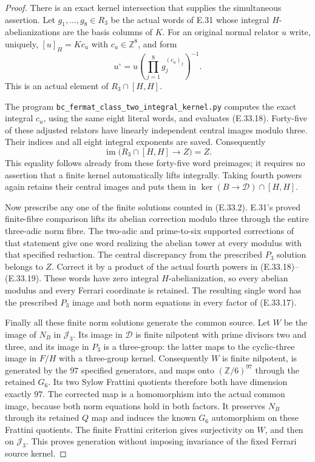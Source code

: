 \begin{proof}
There is an exact kernel intersection that supplies the
simultaneous assertion.  Let $g_1,\ldots,g_8\in R_3$
be the actual words of E.31 whose integral
$H$-abelianizations are the basis columns of $K$.
For an original normal relator $u$ write, uniquely,
$[u]_H=Kc_u$ with $c_u\in\mathbb Z^8$, and form
\[
 u^\circ=u\left(\prod_{j=1}^8g_j^{(c_u)_j}\right)^{-1}.
 \tag{E.33.18}
\]
This is an actual element of $R_3\cap[H,H]$.

The program
\texttt{bc\_fermat\_class\_two\_integral\_kernel.py}
computes the exact integral $c_u$, using the same
eight literal words, and evaluates \textup{(E.33.18)}.
Forty-five of these adjusted relators have linearly
independent central images modulo three.  Their
indices and all eight integral exponents are saved.
Consequently
\[
 \operatorname{im}\bigl(R_3\cap[H,H]\longrightarrow Z\bigr)
                              =Z.
 \tag{E.33.19}
\]
This equality follows already from these forty-five
word preimages; it requires no assertion that a
finite kernel automatically lifts integrally.
Taking fourth powers again retains their central
images and puts them in
$\ker(B\to\mathscr D)\cap[H,H]$.

Now prescribe any one of the finite solutions counted
in \textup{(E.33.2)}.  E.31's proved finite-fibre
comparison lifts its abelian correction modulo three
through the entire three-adic norm fibre.  The two-adic
and prime-to-six supported corrections of that statement
give one word realizing the abelian tower at every
modulus with that specified reduction.
The central discrepancy from the prescribed $P_3$
solution belongs to $Z$.  Correct it by a product
of the actual fourth powers in
\textup{(E.33.18)--(E.33.19)}.
These words have zero integral $H$-abelianization,
so every abelian modulus and every Ferrari coordinate
is retained.  The resulting single word has the
prescribed $P_3$ image and both norm equations in
every factor of \textup{(E.33.17)}.

Finally all these finite norm solutions generate
the common source.  Let $W$ be the image of $N_B$
in $\mathscr J_3$.  Its image in $\mathscr D$
is finite nilpotent with prime divisors two and
three, and its image in $P_3$ is a three-group:
the latter maps to the cyclic-three image in
$F/H$ with a three-group kernel.
Consequently $W$ is finite nilpotent, is generated
by the $97$ specified generators, and maps onto
$(\mathbb Z/6)^{97}$ through the retained $G_6$.
Its two Sylow Frattini quotients therefore both
have dimension exactly $97$.
The corrected map is a homomorphism into the
actual common image, because both norm equations
hold in both factors.  It preserves $N_B$ through
its retained $Q$ map and induces the known
$G_6$ automorphism on these Frattini quotients.
The finite Frattini criterion gives surjectivity
on $W$, and then on $\mathscr J_3$.
This proves generation without imposing invariance
of the fixed Ferrari source kernel.


\end{proof}
